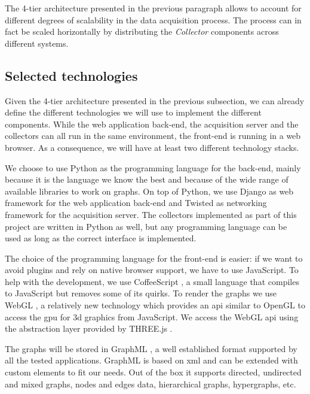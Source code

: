 The 4-tier architecture presented in the previous paragraph allows to account for different degrees of scalability in the data acquisition process. The process can in fact be scaled horizontally by distributing the \emph{Collector} components across different systems.

\subsection{Selected technologies}
\label{sec:case/tech}

Given the 4-tier architecture presented in the previous subsection, we can already define the different technologies we will use to implement the different components. While the web application back-end, the acquisition server and the collectors can all run in the same environment, the front-end is running in a web browser. As a consequence, we will have at least two different technology stacks.

We choose to use Python \cite{python} as the programming language for the back-end, mainly because it is the language we know the best and because of the wide range of available libraries to work on graphs. On top of Python, we use Django \cite{django} as web framework for the web application back-end and Twisted \cite{twisted} as networking framework for the acquisition server. The collectors implemented as part of this project are written in Python as well, but any programming language can be used as long as the correct interface is implemented.

The choice of the programming language for the front-end is easier: if we want to avoid plugins and rely on native browser support, we have to use JavaScript. To help with the development, we use CoffeeScript \cite{coffee}, a small language that compiles to JavaScript but removes some of its quirks. To render the graphs we use WebGL \cite{webgl}, a relatively new technology which provides an \gls{api} similar to OpenGL \cite{opengl} to access the \gls{gpu} for \gls{3d} graphics from JavaScript. We access the WebGL \gls{api} using the abstraction layer provided by THREE.js \cite{three}.

The graphs will be stored in GraphML \cite{graphml}, a well established format supported by all the tested applications. GraphML is based on \gls{xml} and can be extended with custom elements to fit our needs. Out of the box it supports directed, undirected and mixed graphs, nodes and edges data, hierarchical graphs, hypergraphs, etc.

